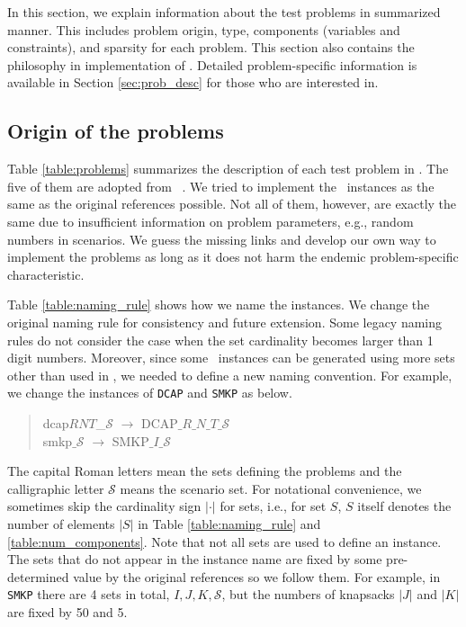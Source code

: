 In this section, we explain information about the test problems in summarized manner. This includes problem origin, type, components (variables and constraints), and sparsity for each problem. This section also contains the philosophy in implementation of \siplibtwo. Detailed problem-specific information is available in Section \ref{sec:prob_desc} for those who are interested in.

\subsection{Origin of the problems}
Table \ref{table:problems} summarizes the description of each test problem in \siplibtwo. The five of them are adopted from \siplib\ \cite{web:SIPLIB1}. We tried to implement the \siplib\ instances as the same as the original references possible. Not all of them, however, are exactly the same due to insufficient information on problem parameters, e.g., random numbers in scenarios. We guess the missing links and develop our own way to implement the problems as long as it does not harm the endemic problem-specific characteristic. 


Table \ref{table:naming_rule} shows how we name the instances. We change the original naming rule for consistency and future extension. Some legacy naming rules do not consider the case when the set cardinality becomes larger than 1 digit numbers. Moreover, since some \siplibtwo\ instances can be generated using more sets other than used in \siplib, we needed to define a new naming convention. For example, we change the instances of \texttt{DCAP} and \texttt{SMKP} as below.
\begin{quote}
	\centering dcap$RNT$\_$\mathcal{S}$ $\longrightarrow$ DCAP$\_R\_N\_T\_\mathcal{S}$\\
	smkp$\_\mathcal{S}$ $\longrightarrow$ SMKP$\_I\_\mathcal{S}$
\end{quote}
The capital Roman letters mean the sets defining the problems and the calligraphic letter $\mathcal{S}$ means the scenario set. For notational convenience, we sometimes skip the cardinality sign $|\cdot|$ for sets, i.e., for set $S$, $S$ itself denotes the number of elements $|S|$ in Table \ref{table:naming_rule} and \ref{table:num_components}. Note that not all sets are used to define an instance. The sets that do not appear in the instance name are fixed by some pre-determined value by the original references so we follow them. For example, in \texttt{SMKP} there are 4 sets in total, $I,J,K,\mathcal{S}$, but the numbers of knapsacks $|J|$ and $|K|$ are fixed by 50 and 5.


